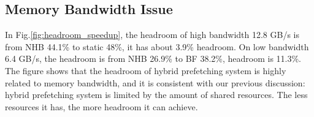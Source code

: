   \subsection{Memory Bandwidth Issue}

  \label{sec:memorybandwidhissue}
  In Fig.\ref{fig:headroom_speedup}, the headroom of high bandwidth 12.8 GB/s is from NHB 44.1\% to static 48\%, it has about 3.9\% headroom. On low bandwidth 6.4 GB/s, the headroom is from NHB 26.9\% to BF 38.2\%, headroom is 11.3\%. 
  The figure shows that the headroom of hybrid prefetching system is highly related to memory bandwidth, and it is consistent with our previous discussion: hybrid prefetching system is limited by the amount of shared resources. 
  The less resources it has, the more headroom it can achieve.\par
  

